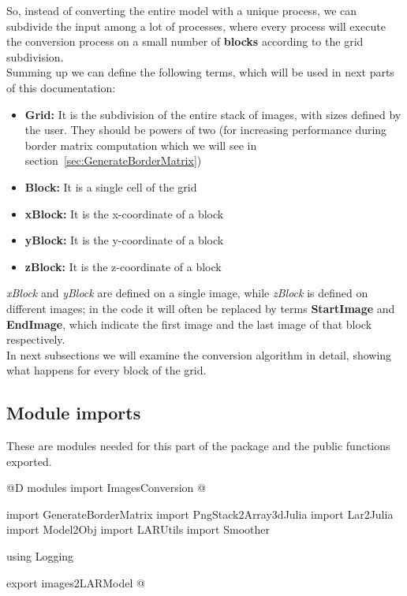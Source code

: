 \documentclass[11pt,oneside]{article}	%
\begin{document}
So, instead of converting the entire model with a unique process, we can subdivide the input among a lot of processes, where every process will execute the conversion process on a small number of \textbf{blocks} according to the grid subdivision.\\

Summing up we can define the following terms, which will be used in next parts of this documentation:

\begin{itemize}
 \item \textbf{Grid:} It is the subdivision of the entire stack of images, with sizes defined by the user. They should be powers of two (for increasing performance during border matrix computation which we will see in section~\ref{sec:GenerateBorderMatrix})
 \item \textbf{Block:} It is a single cell of the grid
 \item \textbf{xBlock:} It is the x-coordinate of a block
 \item \textbf{yBlock:} It is the y-coordinate of a block
 \item \textbf{zBlock:} It is the z-coordinate of a block
\end{itemize}

\textit{xBlock} and \textit{yBlock} are defined on a single image, while \textit{zBlock} is defined on different images; in the code it will often be replaced by terms \textbf{StartImage} and \textbf{EndImage}, which indicate the first image and the last image of that block respectively.\\

In next subsections we will examine the conversion algorithm in detail, showing what happens for every block of the grid.

\subsection{Module imports}\label{sec:ImagesConversionImports}
These are modules needed for this part of the package and the public functions exported.

@D modules import ImagesConversion
@{import GenerateBorderMatrix
import PngStack2Array3dJulia
import Lar2Julia
import Model2Obj
import LARUtils
import Smoother

using Logging

export images2LARModel
@}
\end{document}
